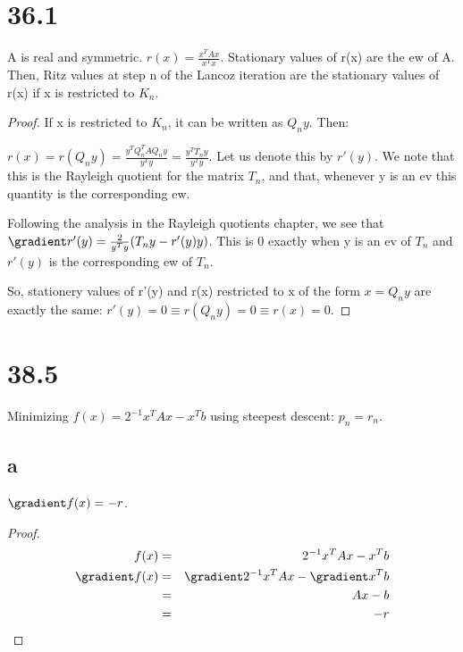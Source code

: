 \documentclass[10pt]{amsart}
\begin{document}
\section{36.1}
\begin{thm}
A is real and symmetric. $r(x) = \frac{x^{T}Ax}{x^{T}x}$. Stationary values of r(x) are the ew of A. Then, Ritz values at step n of the Lancoz iteration are the stationary values of r(x) if x is restricted to $K_{n}$.
\end{thm}
\begin{proof}
If x is restricted to $K_{n}$, it can be written as $Q_{n}y$. Then:

$r(x) = r(Q_{n}y) = \frac{y^{T}Q_{n}^{T}AQ_{n}y}{y^{T}y} = \frac{y^{T}T_{n}y}{y^{T}y}$. Let us denote this by $r'(y)$. We note that this is the Rayleigh quotient for the matrix $T_{n}$, and that, whenever y is an ev this quantity is the corresponding ew.

Following the analysis in the Rayleigh quotients chapter, we see that $\gradient r'(y) = \frac{2}{y^{T}y}(T_{n}y - r'(y)y)$. This is 0 exactly when y is an ev of $T_{n}$ and $r'(y)$ is the corresponding ew of $T_{n}$.

So, stationery values of r'(y) and r(x) restricted to x of the form $x = Q_{n}y$ are exactly the same: $r'(y) = 0 \equiv r(Q_{n}y) = 0 \equiv r(x) = 0$.
\end{proof}

\section{38.5}
Minimizing $f(x) = 2^{-1}x^{T}Ax - x^{T}b$ using steepest descent: $p_{n} = r_{n}$.

\subsection{a}
\begin{thm}
$\gradient f(x) = -r$.
\end{thm}
\begin{proof}
\begin{eqnarray*}
f(x) &=& 2^{-1}x^{T}Ax - x^{T}b\\
\gradient f(x) &=& \gradient 2^{-1}x^{T}Ax - \gradient x^{T}b\\
 &=& Ax - b\\
 &=& -r\\
\end{eqnarray*}
\end{proof}
\end{document}
